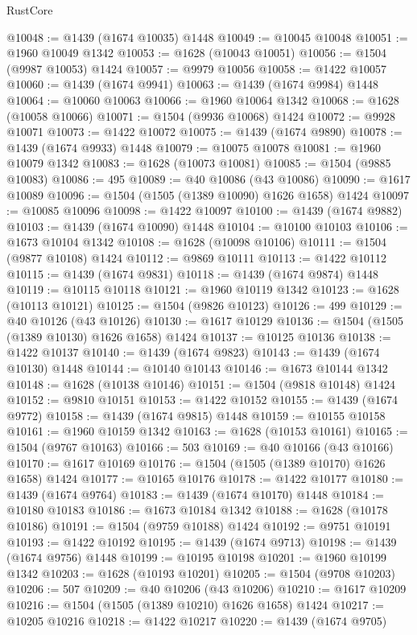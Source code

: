 \begin{lexlean}{RustCore}
\begin{coremodule}
@10048 := @1439 (@1674 @10035) @1448
@10049 := @10045 @10048
@10051 := @1960 @10049 @1342
@10053 := @1628 (@10043 @10051)
@10056 := @1504 (@9987 @10053) @1424
@10057 := @9979 @10056
@10058 := @1422 @10057
@10060 := @1439 (@1674 @9941)
@10063 := @1439 (@1674 @9984) @1448
@10064 := @10060 @10063
@10066 := @1960 @10064 @1342
@10068 := @1628 (@10058 @10066)
@10071 := @1504 (@9936 @10068) @1424
@10072 := @9928 @10071
@10073 := @1422 @10072
@10075 := @1439 (@1674 @9890)
@10078 := @1439 (@1674 @9933) @1448
@10079 := @10075 @10078
@10081 := @1960 @10079 @1342
@10083 := @1628 (@10073 @10081)
@10085 := @1504 (@9885 @10083)
@10086 := 495
@10089 := @40 @10086 (@43 @10086)
@10090 := @1617 @10089
@10096 := @1504 (@1505 (@1389 @10090) @1626 @1658) @1424
@10097 := @10085 @10096
@10098 := @1422 @10097
@10100 := @1439 (@1674 @9882)
@10103 := @1439 (@1674 @10090) @1448
@10104 := @10100 @10103
@10106 := @1673 @10104 @1342
@10108 := @1628 (@10098 @10106)
@10111 := @1504 (@9877 @10108) @1424
@10112 := @9869 @10111
@10113 := @1422 @10112
@10115 := @1439 (@1674 @9831)
@10118 := @1439 (@1674 @9874) @1448
@10119 := @10115 @10118
@10121 := @1960 @10119 @1342
@10123 := @1628 (@10113 @10121)
@10125 := @1504 (@9826 @10123)
@10126 := 499
@10129 := @40 @10126 (@43 @10126)
@10130 := @1617 @10129
@10136 := @1504 (@1505 (@1389 @10130) @1626 @1658) @1424
@10137 := @10125 @10136
@10138 := @1422 @10137
@10140 := @1439 (@1674 @9823)
@10143 := @1439 (@1674 @10130) @1448
@10144 := @10140 @10143
@10146 := @1673 @10144 @1342
@10148 := @1628 (@10138 @10146)
@10151 := @1504 (@9818 @10148) @1424
@10152 := @9810 @10151
@10153 := @1422 @10152
@10155 := @1439 (@1674 @9772)
@10158 := @1439 (@1674 @9815) @1448
@10159 := @10155 @10158
@10161 := @1960 @10159 @1342
@10163 := @1628 (@10153 @10161)
@10165 := @1504 (@9767 @10163)
@10166 := 503
@10169 := @40 @10166 (@43 @10166)
@10170 := @1617 @10169
@10176 := @1504 (@1505 (@1389 @10170) @1626 @1658) @1424
@10177 := @10165 @10176
@10178 := @1422 @10177
@10180 := @1439 (@1674 @9764)
@10183 := @1439 (@1674 @10170) @1448
@10184 := @10180 @10183
@10186 := @1673 @10184 @1342
@10188 := @1628 (@10178 @10186)
@10191 := @1504 (@9759 @10188) @1424
@10192 := @9751 @10191
@10193 := @1422 @10192
@10195 := @1439 (@1674 @9713)
@10198 := @1439 (@1674 @9756) @1448
@10199 := @10195 @10198
@10201 := @1960 @10199 @1342
@10203 := @1628 (@10193 @10201)
@10205 := @1504 (@9708 @10203)
@10206 := 507
@10209 := @40 @10206 (@43 @10206)
@10210 := @1617 @10209
@10216 := @1504 (@1505 (@1389 @10210) @1626 @1658) @1424
@10217 := @10205 @10216
@10218 := @1422 @10217
@10220 := @1439 (@1674 @9705)

\end{coremodule}
\end{lexlean}

